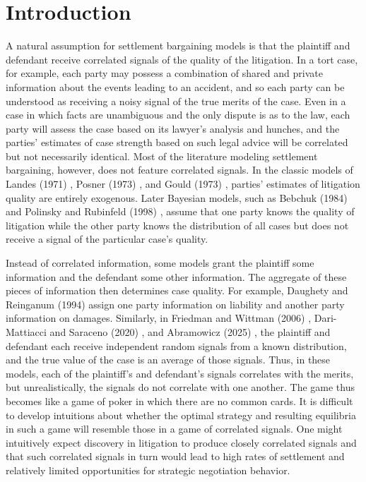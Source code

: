 \documentclass{article}
\begin{document}
\section{Introduction}

A natural assumption for settlement bargaining models is that the plaintiff and defendant receive correlated signals of the quality of the litigation. In a tort case, for example, each party may possess a combination of shared and private information about the events leading to an accident, and so each party can be understood as receiving a noisy signal of the true merits of the case. Even in a case in which facts are unambiguous and the only dispute is as to the law, each party will assess the case based on its lawyer's analysis and hunches, and the parties' estimates of case strength based on such legal advice will be correlated but not necessarily identical. Most of the literature modeling settlement bargaining, however, does not feature correlated signals. In the classic models of Landes (1971) \cite{landes}, Posner (1973) \cite{posner}, and Gould (1973) \cite{gould}, parties' estimates of litigation quality are entirely exogenous. Later Bayesian models, such as Bebchuk (1984) \cite{bebchuk84} and Polinsky and Rubinfeld (1998) \cite{polinskyrubinfeld}, assume that one party knows the quality of litigation while the other party knows the distribution of all cases but does not receive a signal of the particular case's quality. 

Instead of correlated information, some models grant the plaintiff some information and the defendant some other information. The aggregate of these pieces of information then determines case quality. For example, Daughety and Reinganum (1994) \cite{daughetyreinganum1994} assign one party information on liability and another party information on damages. Similarly, in Friedman and Wittman (2006) \cite{friedmanwittman}, Dari-Mattiacci and Saraceno (2020) \cite{darimatiaccisaraceno}, and Abramowicz (2025) \cite{abramowicz}, the plaintiff and defendant each receive independent random signals from a known distribution, and the true value of the case is an average of those signals. Thus, in these models, each of the plaintiff's and defendant's signals correlates with the merits, but unrealistically, the signals do not correlate with one another. The game thus becomes like a game of poker in which there are no common cards. It is difficult to develop intuitions about whether the optimal strategy and resulting equilibria in such a game will resemble those in a game of correlated signals. One might intuitively expect discovery in litigation to produce closely correlated signals and that such correlated signals in turn would lead to high rates of settlement and relatively limited opportunities for strategic negotiation behavior.  
\end{document}
